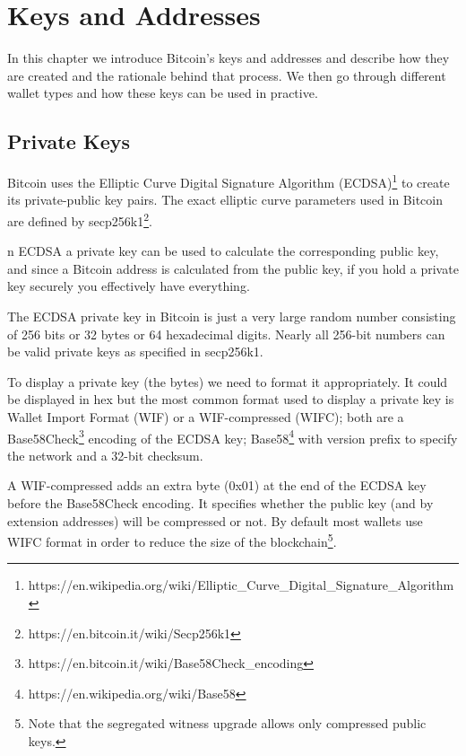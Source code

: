 \chapter{Keys and Addresses}

\begin{summary}
In this chapter we introduce Bitcoin’s keys and addresses and describe how they are created and the rationale behind that process. We then go through different wallet types and how these keys can be used in practive.
\end{summary}

\section{Private Keys}
Bitcoin uses the Elliptic Curve Digital Signature Algorithm (ECDSA)\footnote{https://en.wikipedia.org/wiki/Elliptic\_Curve\_Digital\_Signature\_Algorithm} to create its private-public key pairs. The exact elliptic curve parameters used in Bitcoin are defined by secp256k1\footnote{https://en.bitcoin.it/wiki/Secp256k1}.

\begin{note}
n ECDSA a private key can be used to calculate the corresponding public key, and since a Bitcoin address is calculated from the public key, if you hold a private key securely you effectively have everything.
\end{note}

The ECDSA private key in Bitcoin is just a very large random number consisting of 256 bits or 32 bytes or 64 hexadecimal digits. Nearly all 256-bit numbers can be valid private keys as specified in secp256k1.

To display a private key (the bytes) we need to format it appropriately. It could be displayed in hex but the most common format used to display a private key is Wallet Import Format (WIF) or a WIF-compressed (WIFC); both are a Base58Check\footnote{https://en.bitcoin.it/wiki/Base58Check\_encoding} encoding of the ECDSA key; Base58\footnote{https://en.wikipedia.org/wiki/Base58} with version prefix to specify the network and a 32-bit checksum.

A WIF-compressed adds an extra byte (0x01) at the end of the ECDSA key before the Base58Check encoding. It specifies whether the public key (and by extension addresses) will be compressed or not. By default most wallets use WIFC format in order to reduce the size of the blockchain\footnote{Note that the segregated witness upgrade allows only compressed public keys.}.


